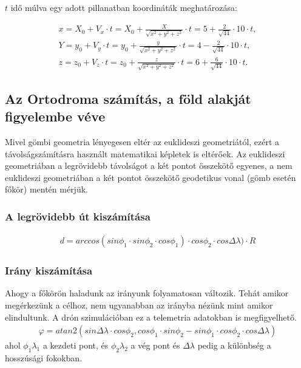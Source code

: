 $t$ idő múlva egy adott pillanatban koordináták meghatározása:

\begin{gather*}
    x = X_0 + V_x \cdot t = X_0 + \frac{X}{\sqrt{x^2 + y^2 + z^2}} \cdot t = 5 + \frac{2}{\sqrt{44}} \cdot 10 \cdot t, \\
    Y = y_0 + V_y \cdot t = y_0 + \frac{y}{\sqrt{x^2 + y^2 + z^2}} \cdot t = 4 - \frac{2}{\sqrt{44}} \cdot 10 \cdot t, \\
    z = z_0 + V_z \cdot t = z_0 + \frac{z}{\sqrt{x^2 + y^2 + z^2}} \cdot t = 6 + \frac{6}{\sqrt{44}} \cdot 10 \cdot t.
\end{gather*}

\subsection{Az Ortodroma számítás, a föld alakját figyelembe véve}

Mivel gömbi geometria lényegesen eltér az euklideszi geometriától, ezért a távolságszámításra használt matematikai képletek is eltérőek.
Az euklideszi geometriában a legrövidebb távolságot a két pontot összekötő egyenes,
a nem euklideszi geometriában a két pontot összekötő geodetikus vonal (gömb esetén főkör) mentén mérjük.

\subsubsection{A legrövidebb út kiszámítása}
\begin{gather*}
    d = arccos(sin\phi_1 \cdot sin\phi_2 \cdot cos\phi_1)\cdot cos\phi_2 \cdot cos\Delta \lambda) \cdot R
\end{gather*}

\subsubsection{Irány kiszámítása}
Ahogy a főkörön haladunk az irányunk folyamatosan változik. Tehát amikor megérkezünk a célhoz, nem ugyanabban az irányba nézünk mint amikor elindultunk.
A drón szimulációban ez a telemetria adatokban is megfigyelhető.
\begin{gather*}
    \varphi = atan2(sin\Delta\lambda \cdot cos\phi_{2}, cos\phi_{1} \cdot sin\phi_{2} - sin\phi_{1} \cdot cos\phi_{2} \cdot cos\Delta\lambda)
\end{gather*}
ahol $\phi_{1}\lambda_{1}$ a kezdeti pont, és $\phi_{2}\lambda_{2}$ a vég pont és $\Delta\lambda$ pedig a különbség a hosszúsági fokokban.

